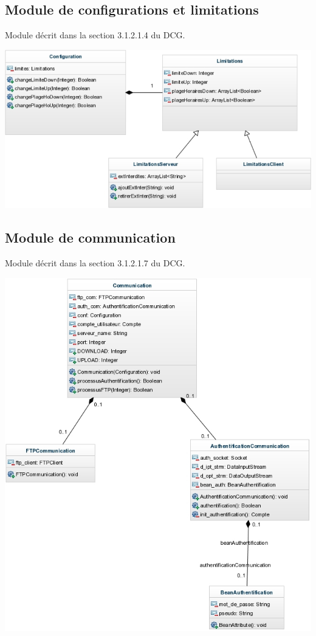 \documentclass[10pt,a4paper]{report}
\begin{document}
\subsection{Module de configurations et limitations}
Module décrit dans la section 3.1.2.1.4 du DCG.
\begin{center}
	\includegraphics[scale=0.5]{./Ressources/modules_lim.png}\\
\end{center}

\newpage

\subsection{Module de communication}
Module décrit dans la section 3.1.2.1.7 du DCG.
\begin{center}
	\includegraphics{./Ressources/communication.jpeg}\\
\end{center}
\end{document}
